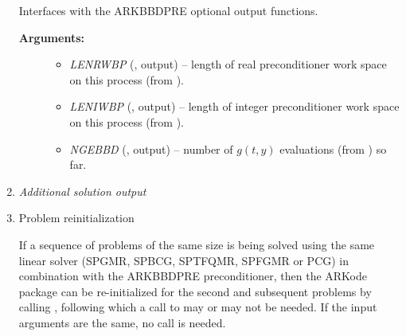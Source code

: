 \documentclass[letterpaper,10pt,english]{sphinxmanual}
\begin{document}
\begin{enumerate}
\begin{fulllineitems}
\label{f_interface/Preconditioning:f/_/FARKBBDOPT}
Interfaces with the ARKBBDPRE optional output functions.
\begin{description}
\item[{\textbf{Arguments:}}] \leavevmode\begin{itemize}
\item {} 
\emph{LENRWBP} (, output) -- length of real
preconditioner work space on this process (from
{\hyperref[c_interface/Preconditioners:c.ARKBBDPrecGetWorkSpace]{\emph{}}}).

\item {} 
\emph{LENIWBP} (, output) -- length of integer
preconditioner work space on this process (from
{\hyperref[c_interface/Preconditioners:c.ARKBBDPrecGetWorkSpace]{\emph{}}}).

\item {} 
\emph{NGEBBD} (, output) -- number of \(g(t,y)\)
evaluations (from {\hyperref[c_interface/Preconditioners:c.ARKBBDPrecGetNumGfnEvals]{\emph{}}}) so
far.

\end{itemize}

\end{description}

\end{fulllineitems}


\item {} 
\emph{Additional solution output}

\item {} 
Problem reinitialization

If a sequence of problems of the same size is being solved using
the same linear solver (SPGMR, SPBCG, SPTFQMR, SPFGMR or PCG) in
combination with the ARKBBDPRE preconditioner, then the ARKode
package can be re-initialized for the second and subsequent
problems by calling {\hyperref[f_interface/Usage:f/_/FARKREINIT]{\emph{}}}, following which a call
to {\hyperref[f_interface/Preconditioning:f/_/FARKBBDREINIT]{\emph{}}} may or may not be needed. If the input
arguments are the same, no {\hyperref[f_interface/Preconditioning:f/_/FARKBBDREINIT]{\emph{}}} call is
needed.


\end{enumerate}
\end{document}
